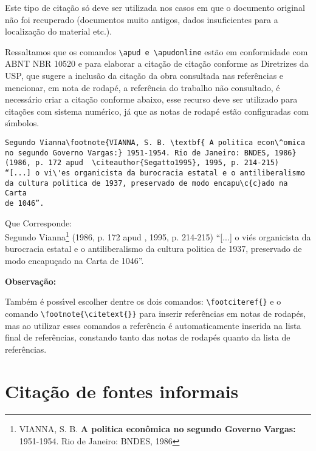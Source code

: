 Este tipo de cita\c{c}\~ao s\'o deve ser utilizada nos casos em que o documento original n\~ao foi recuperado (documentos muito antigos, dados insuficientes para a localiza\c{c}\~ao do material etc.).

Ressaltamos que os comandos \verb+\apud e \apudonline+ est\~ao em conformidade com ABNT NBR 10520 e para elaborar a cita\c{c}\~ao de cita\c{c}\~ao conforme as Diretrizes da USP, que sugere a inclus\~ao da cita\c{c}\~ao da obra consultada nas refer\^encias e mencionar, em nota de rodap\'e, a refer\^encia do trabalho n\~ao consultado, \'e necess\'ario criar a cita\c{c}\~ao conforme abaixo, esse recurso deve ser utilizado para cita\c{c}\~oes com sistema num\'erico, j\'a que as notas de rodap\'e est\~ao configuradas com s\'{\i}mbolos. 



\begin{alineas}
\item 
\begin{verbatim}
Segundo Vianna\footnote{VIANNA, S. B. \textbf{ A politica econ\^omica 
no segundo Governo Vargas:} 1951-1954. Rio de Janeiro: BNDES, 1986}
(1986, p. 172 apud  \citeauthor{Segatto1995}, 1995, p. 214-215) 
“[...] o vi\'es organicista da burocracia estatal e o antiliberalismo 
da cultura politica de 1937, preservado de modo encapu\c{c}ado na Carta 
de 1046”.
\end{verbatim}
\end{alineas}


Que Corresponde: \\

Segundo Vianna\footnote{VIANNA, S. B.\textbf{ A politica econ\^omica no segundo Governo Vargas:} 1951-1954. Rio de Janeiro: BNDES, 1986} (1986, p. 172 apud \citeauthor{Segatto1995}, 1995, p. 214-215) “[...] o vi\'es organicista da burocracia estatal e o antiliberalismo da cultura politica de 1937, preservado de modo encapu\c{c}ado na Carta de 1046”.

\newpage

\textbf{Observa\c{c}\~ao:}

Tamb\'em \'e poss\'{\i}vel escolher dentre os dois comandos: \verb+\footciteref{}+ e o comando \verb+\footnote{\citetext{}}+ para inserir refer\^encias em notas de rodap\'es, mas ao utilizar esses comandos a refer\^encia \'e automaticamente inserida na lista final de refer\^encias, constando tanto das notas de rodap\'es quanto da lista de refer\^encias.

\section{Cita\c{c}\~ao de fontes informais}

